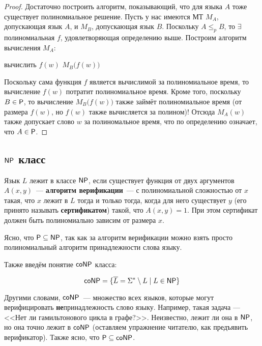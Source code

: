 \documentclass[a4paper, 12pt]{article}
\begin{document}
\begin{proof}
 Достаточно построить алгоритм, показывающий, что для языка $A$ тоже существует 
 полиномиальное решение. Пусть у нас имеются МТ $M_A$, допускающая язык $A$, и 
 $M_B$, допускающая язык $B$. Поскольку $A \leqslant_p B$, то $\exists$ 
 полиномиальная $f$, удовлетворяющая определению выше. Построим алгоритм вычисления $M_A$:
 \begin{algorithmic}
    \State вычислить $f(w)$
    \State \Return $M_B\big(f(w)\big)$
 \end{algorithmic}
 Поскольку сама функция $f$ является вычислимой за полиномиальное время, то 
 вычисление $f(w)$ потратит полиномиальное время. Кроме того, поскольку 
 $B \in \mathsf{P}$, то вычисление $M_B\big(f(w)\big)$ также займёт полиномиальное 
 время (от размера $f(w)$, но $f(w)$ также вычисляется за полином)! Отсюда 
 $M_A(w)$ также допускает слово $w$ за полиномальное время, что по определению 
 означает, что $A \in \mathsf{P}$.
\end{proof}

\subsection{$\mathsf{NP}$ класс}

\begin{Def}
  Язык \(L\) лежит в классе \(\mathsf{NP}\), если существует функция 
  от двух аргументов \(A(x, y)\)~--- \textbf{алгоритм верификации}~---  с 
  полиномиальной сложностью от \(x\) такая, что \(x\) лежит в \(L\) 
  тогда и только тогда, когда для него существует \(y\) (его принято называть 
  \textbf{сертификатом}) такой, что \(A(x, y) = 1\). При этом сертификат должен
  быть полиномиально зависим от размера \(x\).
\end{Def}

Ясно, что $\mathsf{P} \subseteq \mathsf{NP}$, так как за алгоритм верификации можно
взять просто полиномиальный алгоритм принадлежности слова языку.

Также введём понятие $\mathsf{coNP}$ класса:

\begin{Def}
  \[
    \mathsf{coNP} = \{\overline{L} = \Sigma^{*} \setminus L \mid L \in \mathsf{NP}\}
  \]
\end{Def}

Другими словами, $\mathsf{coNP}$~--- множество всех языков, которые могут
верифицировать \textbf{не}принадлежность слово языку. Например, такая задача
--- <<Нет ли гамильтонового цикла в графе?>>. Неизвестно, лежит ли она в $\mathsf{NP}$,
но она точно лежит в $\mathsf{coNP}$ (оставляем упражнение читателю, как предъявить
верификатор). Также ясно, что $\mathsf{P} \subseteq \mathsf{coNP}$.
\end{document}

